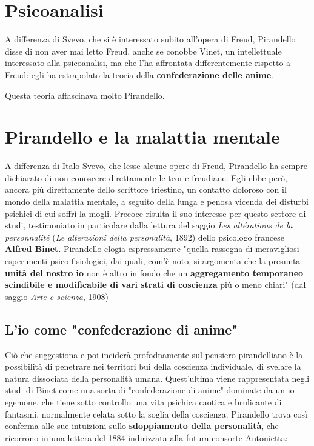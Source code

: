 \documentclass[a4paper, twoside, titlepage]{book}
\begin{document}
\section{Psicoanalisi}

A differenza di Svevo, che si è interessato subito all'opera di Freud, Pirandello disse di non aver mai letto Freud, anche se conobbe Vinet, un intellettuale interessato alla psicoanalisi, ma che l'ha affrontata differentemente rispetto a Freud: egli ha estrapolato la teoria della \textbf{confederazione delle anime}.

Questa teoria affascinava molto Pirandello.

\section{Pirandello e la malattia mentale}

A differenza di Italo Svevo, che lesse alcune opere di Freud, Pirandello ha sempre dichiarato di non conoscere direttamente le teorie freudiane. Egli ebbe però, ancora più direttamente dello scrittore triestino, un contatto doloroso con il mondo della malattia mentale, a seguito della lunga e penosa vicenda dei disturbi psichici di cui soffrì la mogli. Precoce risulta il suo interesse per questo settore di studi, testimoniato in particolare dalla lettura del saggio \textit{Les altérations de la personnalité} (\textit{Le alterazioni della personalità}, 1892) dello psicologo francese \textbf{Alfred Binet}. Pirandello elogia espressamente "quella rassegna di meravigliosi esperimenti psico-fisiologici, dai quali, com'è noto, si argomenta che la presunta \textbf{unità del nostro io} non è altro in fondo che un \textbf{aggregamento temporaneo scindibile e modificabile di vari strati di coscienza} più o meno chiari" (dal saggio \textit{Arte e scienza}, 1908)

\subsection{L'io come "confederazione di anime"}

Ciò che suggestiona e poi inciderà profodnamente sul pensiero pirandelliano è la possibilità di penetrare nei territori bui della coscienza individuale, di svelare la natura dissociata della personalità umana. Quest'ultima viene rappresentata negli studi di Binet come una sorta di "confederazione di anime" dominate da un io egemone, che tiene sotto controllo una vita psichica caotica e brulicante di fantasmi, normalmente celata sotto la soglia della coscienza. Pirandello trova così conferma alle sue intuizioni sullo \textbf{sdoppiamento della personalità}, che ricorrono in una lettera del 1884 indirizzata alla futura consorte Antonietta:
\end{document}
